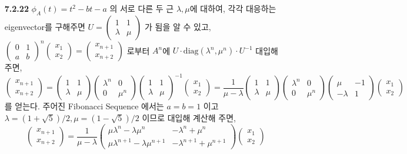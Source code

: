 \documentclass{article}
\begin{document}
\begin{itemize}
\item[\textbf{7.2.22}] $\phi_A(t)=t^2-bt-a$ 의 서로 다른 두 근 $\lambda, \mu$에 대하여, 각각 대응하는 eigenvector를 구해주면 $U = \begin{pmatrix}1&1\\\lambda&\mu\end{pmatrix}$ 가 됨을 알 수 있고, $\begin{pmatrix}0&1\\a&b\end{pmatrix}^n \begin{pmatrix}x_1\\x_2\end{pmatrix} = \begin{pmatrix}x_{n+1}\\x_{n+2}\end{pmatrix}$ 로부터 $A^n$에 $U\cdot \text{diag}(\lambda^n, \mu^n)\cdot U^{-1}$  대입해 주면,
$$\begin{pmatrix}x_{n+1}\\x_{n+2}\end{pmatrix} = \begin{pmatrix}1&1\\\lambda&\mu\end{pmatrix} \begin{pmatrix}\lambda^n&0\\0&\mu^n\end{pmatrix}\begin{pmatrix}1&1\\\lambda&\mu\end{pmatrix}^{-1} \begin{pmatrix}x_1\\x_2\end{pmatrix}= \frac{1}{\mu-\lambda}\begin{pmatrix}1&1\\\lambda&\mu\end{pmatrix} \begin{pmatrix}\lambda^n&0\\0&\mu^n\end{pmatrix}\begin{pmatrix}\mu&-1\\-\lambda&1\end{pmatrix}\begin{pmatrix}x_1\\x_2\end{pmatrix}$$ 를 얻는다. 주어진 Fibonacci Sequence 에서는 $a=b=1$ 이고 $\lambda = (1+\sqrt{5})/2, \mu = (1-\sqrt{5})/2$ 이므로 대입해 계산해 주면,
$$\begin{pmatrix}x_{n+1}\\x_{n+2}\end{pmatrix} = \frac{1}{\mu-\lambda} \begin{pmatrix}\mu \lambda^n-\lambda \mu^n & -\lambda^n+\mu^n \\ \mu \lambda^{n+1}-\lambda \mu^{n+1} & -\lambda^{n+1}+\mu^{n+1}\end{pmatrix}\begin{pmatrix}x_1\\x_2\end{pmatrix}$$

\end{itemize}
\end{document}

